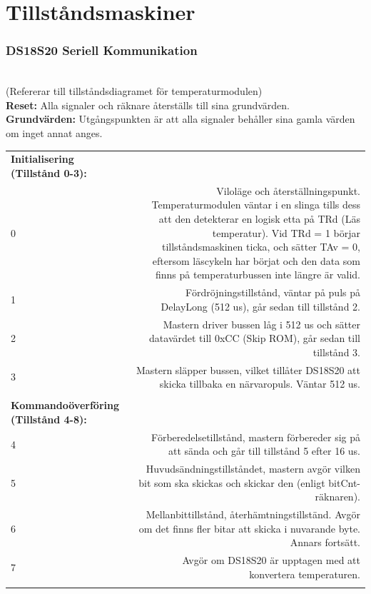 \documentclass[a4paper,11pt]{article}
\begin{document}
\section{Tillståndsmaskiner}
		\subsubsection{DS18S20 Seriell Kommunikation}
			\\(Refererar till tillståndsdiagramet för temperaturmodulen)\\
			{\bf Reset:} Alla signaler och räknare återställs till sina grundvärden.\\
			{\bf Grundvärden:} Utgångspunkten är att alla signaler behåller sina gamla värden om inget annat anges.\\
			\begin{tabular}{l r}
				\\{\bf Initialisering (Tillstånd 0-3):} &  \\
				0 & Viloläge och återställningspunkt. Temperaturmodulen väntar i en slinga tills dess att den detekterar en logisk etta på TRd (Läs temperatur). Vid TRd = 1 börjar tillståndsmaskinen ticka, och sätter TAv = 0, eftersom läscykeln har börjat och den data som finns på temperaturbussen inte längre är valid.\\
				1 & Fördröjningstillstånd, väntar på puls på DelayLong (512 us), går sedan till tillstånd 2.\\
				2 & Mastern driver bussen låg i 512 us och sätter datavärdet till 0xCC (Skip ROM), går sedan till tillstånd 3.\\
				3 & Mastern släpper bussen, vilket tillåter DS18S20 att skicka tillbaka en närvaropuls. Väntar 512 us.\\\\
				{\bf Kommandoöverföring (Tillstånd 4-8):} &  \\
				4 & Förberedelsetillstånd, mastern förbereder sig på att sända och går till tillstånd 5 efter 16 us.\\
				5 & Huvudsändningstillståndet, mastern avgör vilken bit som ska skickas och skickar den (enligt bitCnt-räknaren).\\
				6 & Mellanbittillstånd, återhämtningstillständ. Avgör om det finns fler bitar att skicka i nuvarande byte. Annars fortsätt.\\
				7 & Avgör om DS18S20 är upptagen med att konvertera temperaturen.\\\\
			\end{tabular}
\end{document}
